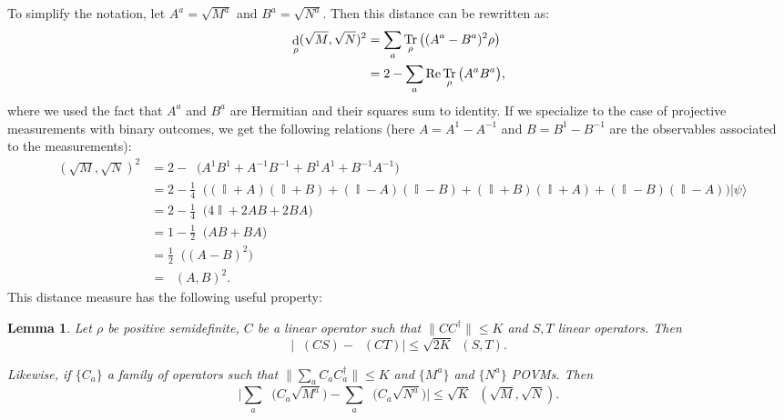 \documentclass[11pt,letterpaper]{article}
\newcommand{\<}{\langle}
\renewcommand{\>}{\rangle}
\newtheorem{lemma}[theorem]{Lemma}
\newcommand{\ket}[1]{| #1 \>}
\DeclareMathOperator{\Id}{\mathbb{I}}
\DeclareMathOperator{\Tr}{Tr}
\DeclareMathOperator{\DIS}{d}
\DeclareMathOperator{\Drho}{\DIS_\rho}
\DeclareMathOperator{\Trho}{\Tr_\rho}
\renewcommand{\Re}{\mathrm{Re}}
\begin{document}
To simplify the notation, let $A^a = \sqrt{M^a}$ and $B^a =
\sqrt{N^a}$. Then this distance can be rewritten as:
\begin{align}
  \Drho(\sqrt{M}, \sqrt{N})^2 &= \sum_a \Trho\big( (A^a - B^a)^2 \rho\big) \notag\\
               &= 2 - \sum_a \Re \Trho\big( A^a B^a \big),\label{eq:dpsi-1a}
\end{align}
where we  used the fact that $A^a$ and $B^a$ are
Hermitian and their squares sum to identity. If we specialize to the case of projective measurements
with binary outcomes, we get the following relations (here $A =
A^1 - A^{-1}$ and $B = B^1 - B^{-1}$
are the observables associated to the measurements):
\begin{align}
\Drho(\sqrt{M}, \sqrt{N})^2  &= 2 - \Trho\big(A^{1} B^{1} + A^{-1} B^{-1} + B^{1} A^{1} + B^{-1}
                 A^{-1}\big)  \nonumber \\
               &= 2 - \frac{1}{4} \Trho\big((\Id + A)(\Id + B)
                 + (\Id - A)(\Id - B) + (\Id + B)(\Id + A)
                 + (\Id  - B)(\Id - A)\big) \ket{\psi} \nonumber \\
               &= 2 - \frac{1}{4}\Trho\big(4\Id + 2 AB + 2 BA\big)\nonumber \\
               &= 1 - \frac{1}{2} \Trho\big(AB + BA\big)  \nonumber \\
               &= \frac{1}{2} \Trho\big((A - B)^2\big)\label{eq:dist_observables}    \\
                &= \Drho(A, B)^2. \nonumber
\end{align}
This distance measure has the following useful property:

\begin{lemma}
  Let $\rho$ be positive semidefinite, $C$ be a linear operator such that $\|
  CC^\dagger\| \leq K$ and $S, T$ linear operators. Then
  $$\Big|\Trho (C S)- \Trho(CT ) \Big| \leq
  \sqrt{2K} \Drho(S, T).$$

  Likewise, if $\{C_a\}$ a family of operators such that $\|\sum_a C_aC_a^\dagger\|\leq K$ and $\{M^a\}$
  and $\{N^a\}$ POVMs. Then 
  $$\Big|\sum_a \Trho\big(  C_a \sqrt{M^a}\big) - \sum_a \Trho\big( C_a \sqrt{N^a}\big)\Big| \leq \sqrt{K}\Drho(\sqrt{M}, \sqrt{N}).$$
  \label{lem:approx}
\end{lemma}
\end{document}
